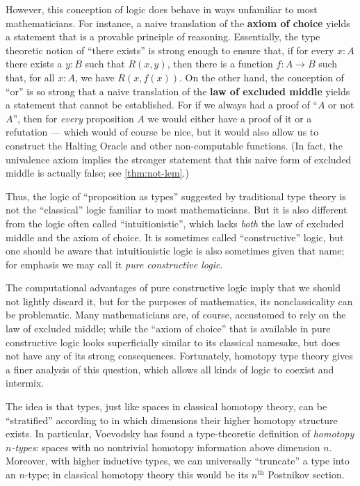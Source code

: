 {However, this conception of logic does behave in ways unfamiliar to most mathematicians.
For instance, a naive translation of the \textbf{axiom of choice} yields a statement that is a provable principle of reasoning.
Essentially, the type theoretic notion of ``there exists'' is strong enough to ensure that, if for every $x: A$ there exists a $y:B$ such that $R(x,y)$, then there is a function $f : A\to B$ such that, for all $x:A$, we have $R(x, f(x))$.
On the other hand, the conception of ``or'' is so strong that a naive translation of the \textbf{law of excluded middle} yields a statement that cannot be established.
For if we always had a proof of ``$A$ or not $A$'', then for \emph{every} proposition $A$ we would either have a proof of it or a refutation --- which would of course be nice, but it would also allow us to construct the Halting Oracle and other non-computable functions.
(In fact, the univalence axiom implies the stronger statement that this naive form of excluded middle is actually false; see \autoref{thm:not-lem}.)

Thus, the logic of ``proposition as types'' suggested by traditional type theory is not the ``classical'' logic familiar to most mathematicians.
But it is also different from the logic often called ``intuitionistic'', which lacks \emph{both} the law of excluded middle and the axiom of choice.
It is sometimes called ``constructive'' logic, but one should be aware that intuitionistic logic is also sometimes given that name; for emphasis we may call it \emph{pure constructive logic}.

The computational advantages of pure constructive logic imply that we should not lightly discard it, but for the purposes of mathematics, its nonclassicality can be problematic.
Many mathematicians are, of course, accustomed to rely on the law of excluded middle; while the ``axiom of choice'' that is available in pure constructive logic looks superficially similar to its classical namesake, but does not have any of its strong consequences.
Fortunately, homotopy type theory gives a finer analysis of this question, which allows all kinds of logic to coexist and intermix.

The idea is that types, just like spaces in classical homotopy theory, can be ``stratified'' according to in which dimensions their higher homotopy structure exists.
In particular, Voevodsky has found a type-theoretic definition of \emph{homotopy $n$-types}: spaces with no nontrivial homotopy information above dimension $n$.
Moreover, with higher inductive types, we can universally ``truncate'' a type into an $n$-type; in classical homotopy theory this would be its $n^{\mathrm{th}}$ Postnikov section.

}
